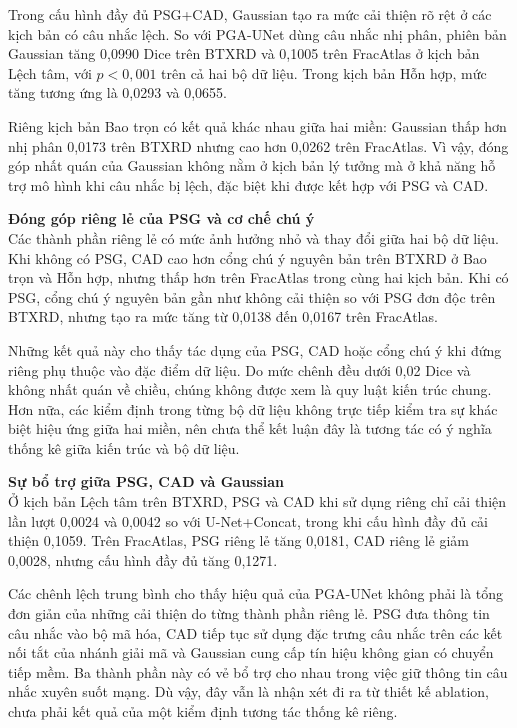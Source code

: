 Trong cấu hình đầy đủ PSG+CAD, Gaussian tạo ra mức cải thiện rõ rệt ở các kịch bản có câu nhắc lệch. So với PGA-UNet dùng câu nhắc nhị phân, phiên bản Gaussian tăng 0,0990 Dice trên BTXRD và 0,1005 trên FracAtlas ở kịch bản Lệch tâm, với $p<0{,}001$ trên cả hai bộ dữ liệu. Trong kịch bản Hỗn hợp, mức tăng tương ứng là 0,0293 và 0,0655.

Riêng kịch bản Bao trọn có kết quả khác nhau giữa hai miền: Gaussian thấp hơn nhị phân 0,0173 trên BTXRD nhưng cao hơn 0,0262 trên FracAtlas. Vì vậy, đóng góp nhất quán của Gaussian không nằm ở kịch bản lý tưởng mà ở khả năng hỗ trợ mô hình khi câu nhắc bị lệch, đặc biệt khi được kết hợp với PSG và CAD.

\noindent\textbf{Đóng góp riêng lẻ của PSG và cơ chế chú ý}\\
Các thành phần riêng lẻ có mức ảnh hưởng nhỏ và thay đổi giữa hai bộ dữ liệu. Khi không có PSG, CAD cao hơn cổng chú ý nguyên bản trên BTXRD ở Bao trọn và Hỗn hợp, nhưng thấp hơn trên FracAtlas trong cùng hai kịch bản. Khi có PSG, cổng chú ý nguyên bản gần như không cải thiện so với PSG đơn độc trên BTXRD, nhưng tạo ra mức tăng từ 0,0138 đến 0,0167 trên FracAtlas.

Những kết quả này cho thấy tác dụng của PSG, CAD hoặc cổng chú ý khi đứng riêng phụ thuộc vào đặc điểm dữ liệu. Do mức chênh đều dưới 0,02 Dice và không nhất quán về chiều, chúng không được xem là quy luật kiến trúc chung. Hơn nữa, các kiểm định trong từng bộ dữ liệu không trực tiếp kiểm tra sự khác biệt hiệu ứng giữa hai miền, nên chưa thể kết luận đây là tương tác có ý nghĩa thống kê giữa kiến trúc và bộ dữ liệu.

\noindent\textbf{Sự bổ trợ giữa PSG, CAD và Gaussian}\\
Ở kịch bản Lệch tâm trên BTXRD, PSG và CAD khi sử dụng riêng chỉ cải thiện lần lượt 0,0024 và 0,0042 so với U-Net+Concat, trong khi cấu hình đầy đủ cải thiện 0,1059. Trên FracAtlas, PSG riêng lẻ tăng 0,0181, CAD riêng lẻ giảm 0,0028, nhưng cấu hình đầy đủ tăng 0,1271.

Các chênh lệch trung bình cho thấy hiệu quả của PGA-UNet không phải là tổng đơn giản của những cải thiện do từng thành phần riêng lẻ. PSG đưa thông tin câu nhắc vào bộ mã hóa, CAD tiếp tục sử dụng đặc trưng câu nhắc trên các kết nối tắt của nhánh giải mã và Gaussian cung cấp tín hiệu không gian có chuyển tiếp mềm. Ba thành phần này có vẻ bổ trợ cho nhau trong việc giữ thông tin câu nhắc xuyên suốt mạng. Dù vậy, đây vẫn là nhận xét đi ra từ thiết kế ablation, chưa phải kết quả của một kiểm định tương tác thống kê riêng.

